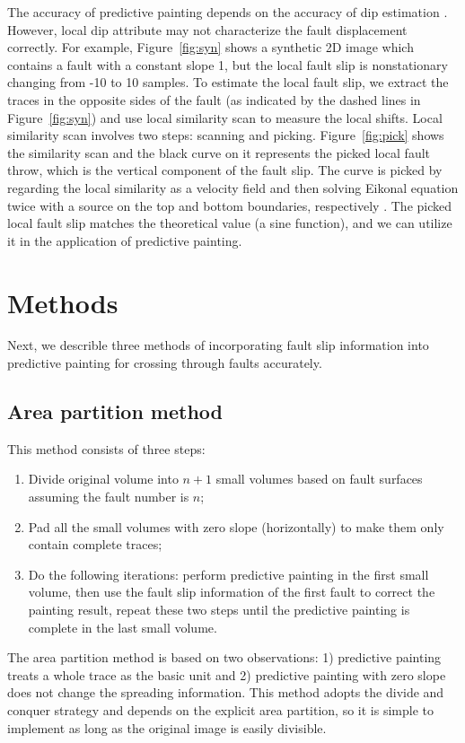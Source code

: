 The accuracy of predictive painting depends on the accuracy of dip estimation \cite[]{fomel02}.
However, local dip attribute may not characterize the fault displacement correctly.
For example, Figure~\ref{fig:syn} shows a synthetic 2D image which contains a fault with a constant slope 1, 
but the local fault slip is nonstationary changing from -10 to 10 samples.
To estimate the local fault slip, we extract the traces in the opposite sides of the fault (as indicated by the dashed lines in Figure~\ref{fig:syn}) and use local similarity scan \cite[]{fomel07b} to measure the local shifts.
Local similarity scan involves two steps: scanning and picking. 
Figure~\ref{fig:pick} shows the similarity scan and the black curve on it represents the picked local fault throw, which is the vertical component of the fault slip.
The curve is picked by regarding the local similarity as a velocity field and then solving Eikonal equation twice with a source on the top and bottom boundaries, respectively \cite[]{fomel09c}.
The picked local fault slip matches the theoretical value (a sine function), and we can utilize it in the application of predictive painting.


\section{Methods}
Next, we describle three methods of incorporating fault slip information into predictive painting for crossing through faults accurately.

\subsection{Area partition method}

This method consists of three steps:
\begin{enumerate}
	\item Divide original volume into $n+1$ small volumes based on fault surfaces assuming the fault number is $n$;
	\item Pad all the small volumes with zero slope (horizontally) to make them only contain complete traces;
	\item Do the following iterations: perform predictive painting in the first small volume, then use the fault slip information of the first fault to correct the painting result, repeat these two steps until the predictive painting is complete in the last small volume.
\end{enumerate}
The area partition method is based on two observations: 1) predictive painting treats a whole trace as the basic unit and
2) predictive painting with zero slope does not change the spreading information.
This method adopts the divide and conquer strategy and depends on the explicit area partition, so it is simple to implement as long as the original image is easily divisible.

